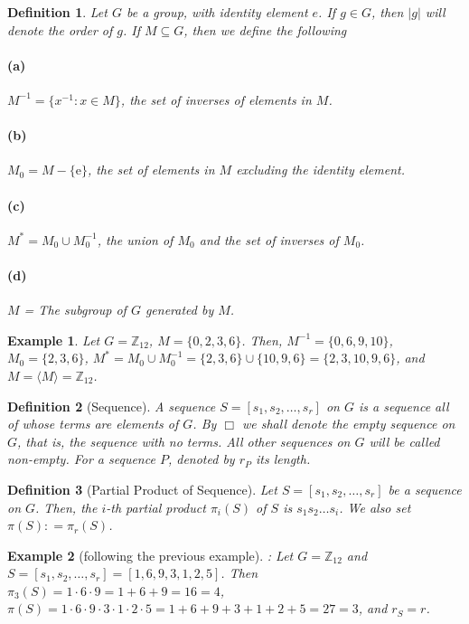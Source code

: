 \documentclass{article}
\newtheorem{definition}{Definition}
\newtheorem{example}{Example}
\begin{document}
\begin{definition} 
Let $G$ be a group, with identity element $e$. If $g \in G$, then $|g|$ will denote the order of $g$. If $M \subseteq G$, then we define the following
\paragraph{(a)} 
$M^{-1} = \{x^{-1} : x \in M\}$, the set of inverses of elements in $M$.
\paragraph{(b)}
$M_0 = M - \{\text{e}\}$, the set of elements in $M$ excluding the identity element.
\paragraph{(c)} 
$M^* = M_0 \cup M_0^{-1}$, the union of $M_0$ and the set of inverses of $M_0$.
\paragraph{(d)} 
$M$ = The subgroup of $G$ generated by $M$.
\end{definition}
\begin{example}
Let $G=\mathbb{Z}_{12}$, $M = \{0, 2, 3, 6\}$. Then, $M^{-1} = \{0, 6, 9, 10\}$, $M_0 = \{2, 3, 6\}$, $M^* = M_0 \cup M_0^{-1} = \{2, 3, 6\}\cup\{10, 9, 6\} = \{2, 3, 10, 9, 6\}$, and $M = \langle M\rangle = \mathbb{Z}_{12}$.
\end{example}

\begin{definition}[Sequence] 
A \textit{sequence} $S = [s_1, s_2, \dots, s_r]$ on $G$ is a sequence all of whose terms are elements of $G$. By $\Box$ we shall denote the empty sequence on $G$, that is, the sequence with no terms. All other sequences on $G$ will be called non-empty. For a sequence $P$, denoted by $r_P$ its length.
\end{definition}

\begin{definition}[Partial Product of Sequence] 
Let $S = [s_1, s_2, \dots, s_r]$ be a sequence on $G$. Then, the $i$-th partial product $\pi_i(S)$ of $S$ is $s_1 s_2 \dots s_i$. We also set $\pi(S) \colon= \pi_r(S)$.
\end{definition}
\begin{example}[following the previous example]:
Let $G=\mathbb{Z}_{12}$ and $S = [s_1, s_2, \dots, s_r] = [1, 6, 9, 3, 1, 2, 5]$. Then $\pi_3(S) = 1 \cdot 6 \cdot 9 = 1+6+9 = 16 = 4$, $\pi(S) = 1 \cdot 6 \cdot 9 \cdot 3 \cdot 1 \cdot 2 \cdot 5 = 1+6+9+3+1+2+5 = 27 = 3$, and $r_S = r$.
\end{example}
\end{document}
